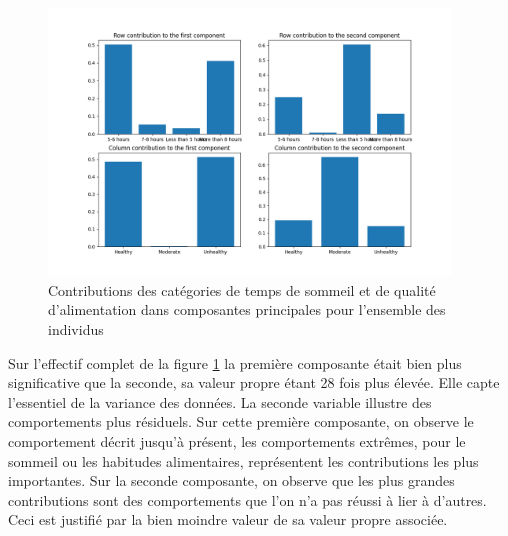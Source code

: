 \begin{figure}[H]
  \begin{center}
    \includegraphics[width=0.95\textwidth]{Images/Sleep_Dietary_all/RowColumnsContributions.png}
  \end{center}
  \caption{Contributions des catégories de temps de sommeil et de qualité d'alimentation dans composantes principales pour l'ensemble des individus}
  \label{fig:contribSleepDietaryAll}
\end{figure}

Sur l’effectif complet de la figure \ref{fig:contribSleepDietaryAll} la première composante était bien plus significative que la seconde, sa valeur propre étant 28 fois plus élevée. Elle capte l’essentiel de la variance des données. La seconde variable illustre des comportements plus résiduels.
Sur cette première composante, on observe le comportement décrit jusqu’à présent, les comportements extrêmes, pour le sommeil ou les habitudes alimentaires, représentent les contributions les plus importantes. Sur la seconde composante, on observe que les plus grandes contributions sont des comportements que l’on n’a pas réussi à lier à d’autres. Ceci est justifié par la bien moindre valeur de sa valeur propre associée.

